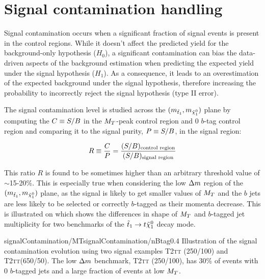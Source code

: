     \section{Signal contamination handling \label{sec:signalContamination}}

    Signal contamination occurs when a significant fraction of signal events is present in
    the control regions. While it doesn't affect the predicted yield for the background-only hypothesis
    ($H_0$), a significant contamination can bias the data-driven aspects of the background
    estimation when predicting the expected yield under the signal hypothesis ($H_1$). As a
    consequence, it leads to an overestimation of the expected background under the signal hypothesis,
    therefore increasing the probability to incorrectly reject the signal hypothesis (type II error).

    The signal contamination level is studied across the $(m_{\tilde{t}_1},m_{\tilde{\chi}_1^0})$
    plane by computing the $C \equiv S/B$ in the $M_T$-peak control region and 0 $b$-tag
    control region and comparing it to the signal purity, $P \equiv S/B$, in the signal region:

    \begin{equation}
        R \equiv \frac{C}{P} = \frac{(S/B)_\text{control region}}{(S/B)_\text{signal region}}
        \label{eq:contaminationRatio}
    \end{equation}

    This ratio $R$ is found to be sometimes higher than an arbitrary threshold value of $\sim$15-20\%.
    This is especially true when considering the low $\Delta m$ region of the $(m_{\tilde{t}_1},
    m_{\tilde{\chi}_1^0})$ plane, as the signal is likely to get smaller values of $M_T$ and the $b$ jets
    are less likely to be selected or correctly $b$-tagged as their momenta decrease. This is illustrated
    on  which shows the differences in shape of $M_T$ and
    $b$-tagged jet multiplicity for two benchmarks of the $\tilde{t}_1 \rightarrow t \tilde{\chi}_1^0$ decay mode.

                     {signalContamination/MT}{signalContamination/nBtag}{0.4}
                     {Illustration of the signal contamination evolution using two signal examples
                     \textsc{T2tt} (250/100) and \textsc{T2tt}(650/50). The low $\Delta m$ benchmark, \textsc{T2tt} (250/100),
                     has 30\% of events with 0 $b$-tagged jets and a large fraction of events at low $M_T$.}

